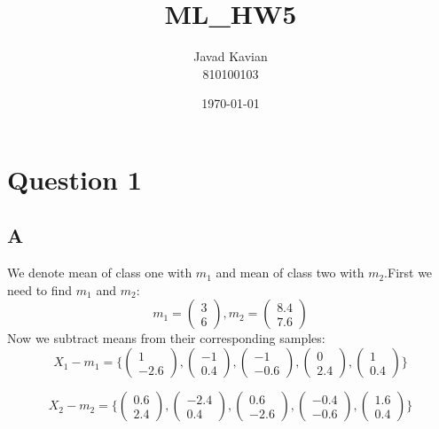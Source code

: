 \documentclass{article}
\title{ML\_HW5}
\author{Javad Kavian\\810100103}
\date{\today}
\begin{document}
\maketitle

\section*{Question 1}
\subsection*{A}
We denote mean of class one with $m_1$ and mean of class two with $m_2$.First we need to find $m_1$ and $m_2$:
\begin{equation*}
    m_1 = \begin{pmatrix}
        3\\6
    \end{pmatrix}, m_2 = \begin{pmatrix}
        8.4\\7.6
    \end{pmatrix}
\end{equation*}
Now we subtract means from their corresponding samples:
\begin{equation*}
    X_1 - m_1 = \lbrace \begin{pmatrix}
        1\\-2.6
    \end{pmatrix},\begin{pmatrix}
        -1\\0.4
    \end{pmatrix},\begin{pmatrix}
        -1\\-0.6
    \end{pmatrix},\begin{pmatrix}
        0\\2.4
    \end{pmatrix},\begin{pmatrix}
        1\\0.4
    \end{pmatrix} \rbrace
\end{equation*}

\begin{equation*}
    X_2 - m_2 = \lbrace \begin{pmatrix}
        0.6\\2.4
    \end{pmatrix},\begin{pmatrix}
        -2.4\\0.4
    \end{pmatrix},\begin{pmatrix}
        0.6\\-2.6
    \end{pmatrix},\begin{pmatrix}
        -0.4\\-0.6
    \end{pmatrix},\begin{pmatrix}
        1.6\\0.4
    \end{pmatrix} \rbrace
\end{equation*}
\end{document}
